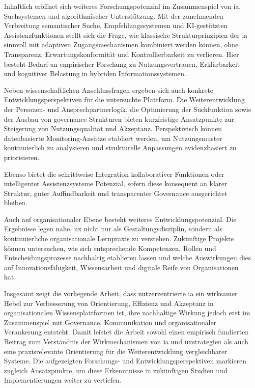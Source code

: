 Inhaltlich eröffnet sich weiteres Forschungspotenzial im Zusammenspiel von \Gls{ia}, Suchsystemen und algorithmischer Unterstützung. Mit der zunehmenden Verbreitung semantischer Suche, Empfehlungssystemen und KI-gestützten Assistenzfunktionen stellt sich die Frage, wie klassische Strukturprinzipien der \Gls{ia} sinnvoll mit adaptiven Zugangsmechanismen kombiniert werden können, ohne Transparenz, Erwartungskonformität und Kontrollierbarkeit zu verlieren. Hier besteht Bedarf an empirischer Forschung zu Nutzungsvertrauen, Erklärbarkeit und kognitiver Belastung in hybriden Informationssystemen.

\newpage

Neben wissenschaftlichen Anschlussfragen ergeben sich auch konkrete Entwicklungsperspektiven für die untersuchte Plattform. Die Weiterentwicklung der Personen- und Ansprechpartnerlogik, die Optimierung der Suchfunktion sowie der Ausbau von \Gls{governance}-Strukturen bieten kurzfristige Ansatzpunkte zur Steigerung von Nutzungsqualität und Akzeptanz. Perspektivisch können datenbasierte Monitoring-Ansätze etabliert werden, um Nutzungsmuster kontinuierlich zu analysieren und strukturelle Anpassungen evidenzbasiert zu priorisieren. 

Ebenso bietet die schrittweise Integration kollaborativer Funktionen oder intelligenter Assistenzsysteme Potenzial, sofern diese konsequent an klarer Struktur, guter Auffindbarkeit und transparenter Governance ausgerichtet bleiben.

Auch auf organisationaler Ebene besteht weiteres Entwicklungspotenzial. Die Ergebnisse legen nahe, \Gls{ux} nicht nur als Gestaltungsdisziplin, sondern als kontinuierliche organisationale Lernpraxis zu verstehen. Zukünftige Projekte können untersuchen, wie sich entsprechende Kompetenzen, Rollen und Entscheidungsprozesse nachhaltig etablieren lassen und welche Auswirkungen dies auf Innovationsfähigkeit, Wissensarbeit und digitale Reife von Organisationen hat.

Insgesamt zeigt die vorliegende Arbeit, dass nutzerzentrierte \Gls{ia} ein wirksamer Hebel zur Verbesserung von Orientierung, Effizienz und Akzeptanz in organisationalen Wissensplattformen ist, ihre nachhaltige Wirkung jedoch erst im Zusammenspiel mit Governance, Kommunikation und organisationaler Verankerung entsteht. Damit leistet die Arbeit sowohl einen empirisch fundierten Beitrag zum Verständnis der Wirkmechanismen von \Gls{ia} und \Gls{uxstrategien} als auch eine praxisrelevante Orientierung für die Weiterentwicklung vergleichbarer Systeme. Die aufgezeigten Forschungs- und Entwicklungsperspektiven markieren zugleich Ansatzpunkte, um diese Erkenntnisse in zukünftigen Studien und Implementierungen weiter zu vertiefen.

